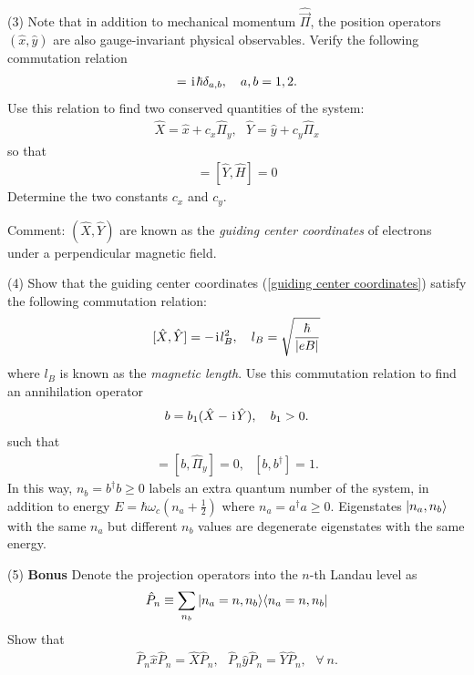 (3) Note that in addition to mechanical momentum $\hat{\vec\Pi}$, the position operators $(\hat x,\hat y)$ are also gauge-invariant physical observables. Verify the following commutation relation
\begin{align}
[\hat x_a,\hat\Pi_b]=\imth\hbar\delta_{a,b},~~~a,b=1,2.
\end{align}
Use this relation to find two conserved quantities of the system:
\begin{align}\label{guiding center coordinates}
\hat X=\hat x+c_x\hat\Pi_y,~~~\hat Y=\hat y+c_y\hat\Pi_x
\end{align}
so that 
\begin{align}
[\hat X,\hat H]=[\hat Y,\hat H]=0
\end{align}
Determine the two constants $c_x$ and $c_y$. 

Comment: $(\hat X,\hat Y)$ are known as the \emph{guiding center coordinates} of electrons under a perpendicular magnetic field. 

(4) Show that the guiding center coordinates (\ref{guiding center coordinates}) satisfy the following commutation relation:
\begin{align}\label{hw10:noncommutative geometry}
[\hat X,\hat Y]=-\hspace{1pt}\mathrm{i}\hspace{1pt} l_B^2,~~~l_B=\sqrt{\frac{\hbar}{|eB|}}
\end{align}
where $l_B$ is known as the \emph{magnetic length}. Use this commutation relation to find an annihilation operator
\begin{align}
b=b_1(\hat X-\hspace{1pt}\mathrm{i}\hspace{1pt}\hat Y),~~~b_1>0.
\end{align}
such that 
\begin{align}
[b,\hat\Pi_x]=[b,\hat\Pi_y]=0,~~~[b,b^\dagger]=1.
\end{align}
In this way, $n_b=b^\dagger b\geq0$ labels an extra quantum number of the system, in addition to energy $E=\hbar\omega_c(n_a+\frac12)$ where $n_a=a^\dagger a\geq0$. Eigenstates $|{n_a,n_b}\rangle$ with the same $n_a$ but different $n_b$ values are degenerate eigenstates with the same energy.

(5) \textbf{ Bonus} Denote the projection operators into the $n$-th Landau level as
\begin{align}
\hat P_n\equiv\sum_{n_b}|{n_a=n,n_b}\rangle\langle{n_a=n,n_b}|
\end{align}
Show that 
\begin{align}
\hat P_n\hat x\hat P_n=\hat X\hat P_n,~~~\hat P_n\hat y\hat P_n=\hat Y\hat P_n,~~~\forall~n. 
\end{align}

